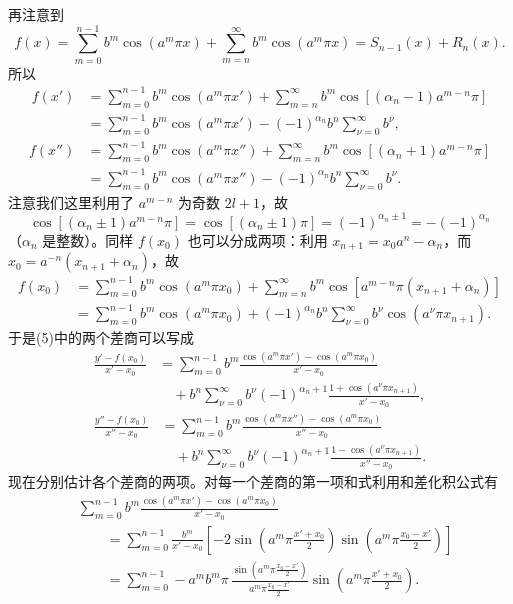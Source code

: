 再注意到
\[
 f(x)=\sum_{m=0}^{n-1}b^m\cos(a^m\pi x)
      +\sum_{m=n}^{\infty}b^m\cos(a^m\pi x)
      =S_{n-1}(x)+R_n(x).
\]
所以
\begin{align*}
 f(x')
 &=\sum_{m=0}^{n-1}b^m\cos(a^m\pi x')
   +\sum_{m=n}^{\infty}b^m\cos[(\alpha_n-1)a^{m-n}\pi]\\
 &=\sum_{m=0}^{n-1}b^m\cos(a^m\pi x')
   -(-1)^{\alpha_n}b^n\sum_{\nu=0}^{\infty}b^\nu,
\end{align*}
\begin{align*}
 f(x'')
 &=\sum_{m=0}^{n-1}b^m\cos(a^m\pi x'')
   +\sum_{m=n}^{\infty}b^m\cos[(\alpha_n+1)a^{m-n}\pi]\\
 &=\sum_{m=0}^{n-1}b^m\cos(a^m\pi x'')
   -(-1)^{\alpha_n}b^n\sum_{\nu=0}^{\infty}b^\nu.
\end{align*}
注意我们这里利用了 $a^{m-n}$ 为奇数 $2l+1$，故
\[
 \cos[(\alpha_n\pm1)a^{m-n}\pi]
 =\cos[(\alpha_n\pm1)\pi]
 =(-1)^{\alpha_n\pm1}
 =-(-1)^{\alpha_n}
\]
（$\alpha_n$ 是整数）。同样 $f(x_0)$ 也可以分成两项：利用 $x_{n+1}=x_0a^n-\alpha_n$，而 $x_0=a^{-n}(x_{n+1}+\alpha_n)$，故
\begin{align*}
 f(x_0)
 &=\sum_{m=0}^{n-1}b^m\cos(a^m\pi x_0)
   +\sum_{m=n}^{\infty}b^m\cos[a^{m-n}\pi(x_{n+1}+\alpha_n)]\\
 &=\sum_{m=0}^{n-1}b^m\cos(a^m\pi x_0)
   +(-1)^{\alpha_n}b^n\sum_{\nu=0}^{\infty}b^\nu\cos(a^\nu\pi x_{n+1}).
\end{align*}
于是(5)中的两个差商可以写成
\begin{align*}
 \frac{y'-f(x_0)}{x'-x_0}
 &=\sum_{m=0}^{n-1}b^m
   \frac{\cos(a^m\pi x')-\cos(a^m\pi x_0)}{x'-x_0}\\
 &\quad+b^n\sum_{\nu=0}^{\infty}b^\nu(-1)^{\alpha_n+1}
 \frac{1+\cos(a^\nu\pi x_{n+1})}{x'-x_0},
\end{align*}
\begin{align*}
 \frac{y''-f(x_0)}{x''-x_0}
 &=\sum_{m=0}^{n-1}b^m
   \frac{\cos(a^m\pi x'')-\cos(a^m\pi x_0)}{x''-x_0}\\
 &\quad+b^n\sum_{\nu=0}^{\infty}b^\nu(-1)^{\alpha_n+1}
 \frac{1-\cos(a^\nu\pi x_{n+1})}{x''-x_0}.
\end{align*}
现在分别估计各个差商的两项。对每一个差商的第一项和式利用和差化积公式有
\begin{align*}
 &\sum_{m=0}^{n-1}b^m
 \frac{\cos(a^m\pi x')-\cos(a^m\pi x_0)}{x'-x_0}\\
 &\qquad=\sum_{m=0}^{n-1}\frac{b^m}{x'-x_0}
 \left[-2\sin\!\left(a^m\pi\frac{x'+x_0}{2}\right)
 \sin\!\left(a^m\pi\frac{x_0-x'}{2}\right)\right]\\
 &\qquad=\sum_{m=0}^{n-1}-a^m b^m\pi\,
 \frac{\sin\!\left(a^m\pi\frac{x_0-x'}2\right)}
      {a^m\pi\frac{x_0-x'}2}
 \sin\!\left(a^m\pi\frac{x'+x_0}{2}\right).
\end{align*}
